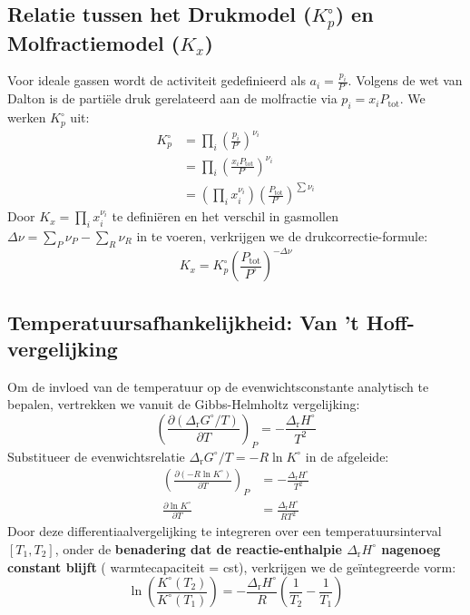 \documentclass[11pt,a4paper]{article}
\begin{document}
\subsection{ Relatie tussen het Drukmodel ($K_p^\circ$) en Molfractiemodel ($K_x$)}
Voor ideale gassen wordt de activiteit gedefinieerd als $a_i = \frac{p_i}{P^\circ}$. Volgens de wet van Dalton is de partiële druk gerelateerd aan de molfractie via $p_i = x_i P_{\text{tot}}$. We werken $K_p^\circ$ uit:
\begin{align}
    K_p^\circ &= \prod_{i} \left( \frac{p_i}{P^\circ} \right)^{\nu_i} \\
              &= \prod_{i} \left( \frac{x_i P_{\text{tot}}}{P^\circ} \right)^{\nu_i} \\
              &= \left( \prod_{i} x_i^{\nu_i} \right) \left( \frac{P_{\text{tot}}}{P^\circ} \right)^{\sum \nu_i}
\end{align}
Door $K_x = \prod_{i} x_i^{\nu_i}$ te definiëren en het verschil in gasmollen $\Delta \nu = \sum_P \nu_P - \sum_R \nu_R$ in te voeren, verkrijgen we de drukcorrectie-formule:
\begin{equation}
    K_x = K_p^\circ \left( \frac{P_{\text{tot}}}{P^\circ} \right)^{-\Delta \nu}
\end{equation}

\subsection{ Temperatuursafhankelijkheid: Van 't Hoff-vergelijking}
Om de invloed van de temperatuur op de evenwichtsconstante analytisch te bepalen, vertrekken we vanuit de Gibbs-Helmholtz vergelijking:
\begin{equation}
    \left( \frac{\partial (\Delta_{\text{r}}G^\circ / T)}{\partial T} \right)_P = -\frac{\Delta_{\text{r}}H^\circ}{T^2}
\end{equation}
Substitueer de evenwichtsrelatie $\Delta_{\text{r}}G^\circ / T = -R \ln K^\circ$ in de afgeleide:
\begin{align}
    \left( \frac{\partial (-R \ln K^\circ)}{\partial T} \right)_P &= -\frac{\Delta_{\text{r}}H^\circ}{T^2} \\
    \frac{\partial \ln K^\circ}{\partial T} &= \frac{\Delta_{\text{r}}H^\circ}{RT^2}
\end{align}
Door deze differentiaalvergelijking te integreren over een temperatuursinterval $[T_1, T_2]$, onder de \textbf{benadering dat de reactie-enthalpie $\Delta_{\text{r}}H^\circ$ nagenoeg constant blijft} ( warmtecapaciteit = cst), verkrijgen we de geïntegreerde vorm:
\begin{equation}
    \boxed{
    \ln \left( \frac{K^\circ(T_2)}{K^\circ(T_1)} \right) = -\frac{\Delta_{\text{r}}H^\circ}{R} \left( \frac{1}{T_2} - \frac{1}{T_1} \right)
    }
\end{equation}
\end{document}

